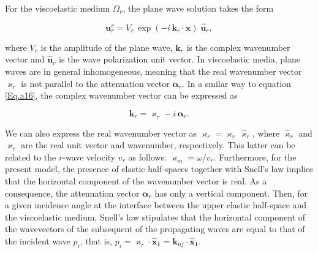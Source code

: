 \documentclass[draft]{agujournal2019}
\begin{document}
For the viscoelastic medium $\Omega_v$, the plane wave solution takes the form
\begin{linenomath*}
\begin{equation}\label{Eq.b5}
\bm{u}_r^v = V_r\, \exp (- i \,\bm{k}_r \cdot \bm {x} ) \; \bm{\hat {u}}_r, 
\end{equation}
\end{linenomath*}
where $V_r$ is the amplitude of the plane wave, $\bm{k}_r$ is the complex wavenumber vector and $\bm{\hat {u}}_r$ is the wave polarization unit vector. In viscoelastic media, plane waves are in general inhomogeneous,
meaning that the real wavenumber vector $\bm{\varkappa}_r $  is not parallel to the attenuation vector $\bm{\alpha}_r$.  In a smilar way to equation \eqref{Eq.a16}, the complex wavenumber vector can be expressed as
\begin{linenomath*}
\begin{equation}\label{Eq.b6}
\bm{k}_r= \bm{\varkappa}_r - i\, \bm{\alpha}_r.
\end{equation}
\end{linenomath*}
We can also express the real wavenumber vector as $\bm{\varkappa}_r = {\varkappa}_r \, \bm{\hat{\varkappa}}_r $, where $\bm{\hat{\varkappa}}_r$ and ${\varkappa}_r$ are the real unit vector and  wavenumber, respectively. This latter can be related to the $r$-wave velocity $v_r$ as follows: ${\varkappa}_m = \omega/v_r$.
Furthermore, for the present model, the presence of elastic half-spaces together with Snell's law implies that the horizontal component of the wavenumber vector is real. As a consequence, the attenuation vector $\bm{\alpha}_r$ has only a vertical component. Then, for a given incidence angle at the interface between the upper elastic half-space and the viscoelastic medium, Snell's law stipulates that the horizontal component of the wavevectors of the subsequent of the propagating waves are equal to that of the incident wave $p_i$, that is, $p_i = \bm{\varkappa}_{r} \cdot \bm{\hat{x}_1} = \bm{k}_{nj} \cdot \bm{\hat{x}_1}$.
\end{document}
